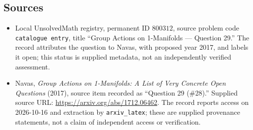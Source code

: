 \documentclass[11pt]{article}
\begin{document}
\subsection{Sources}
\begin{itemize}
\item Local UnsolvedMath registry, permanent ID \(800312\), source problem code \texttt{catalogue entry}, title ``Group Actions on 1-Manifolds --- Question 29.'' The record attributes the question to Navas, with proposed year 2017, and labels it open; this status is supplied metadata, not an independently verified assessment.
\item Navas, \emph{Group Actions on 1-Manifolds: A List of Very Concrete Open Questions} (2017), source item recorded as ``Question 29 (\#28).'' Supplied source URL: \url{https://arxiv.org/abs/1712.06462}. The record reports access on 2026-10-16 and extraction by \texttt{arxiv\_latex}; these are supplied provenance statements, not a claim of independent access or verification.
\end{itemize}
\end{document}
